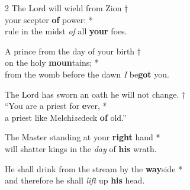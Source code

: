 

\begin{multicols}{2}
    \small
    The Lord will wield from Zion †\\
your scepter \textbf{of} power: *\\
rule in the midst \emph{of} all \textbf{your} foes.

A prince from the day of your birth †\\
on the holy \textbf{moun}tains; *\\
from the womb before the dawn \emph{I} be\textbf{got} you.

The Lord has sworn an oath he will not change. †\\
“You are a priest for \textbf{e}ver, *\\
a priest like Melchi\emph{ze}deck \textbf{of} old.”

The Master standing at your \textbf{right} hand *\\
will shatter kings in the \emph{day} of \textbf{his} wrath.

He shall drink from the stream by the \textbf{way}side *\\
and therefore he shall \emph{lift} up \textbf{his} head.
\end{multicols}
